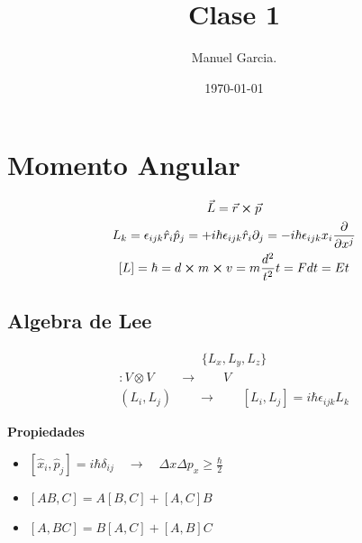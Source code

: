 \documentclass{article}
\title{Clase 1 }
\author{Manuel Garcia.}
\date{\today}
\begin{document}
\maketitle

\section{Momento Angular }
\begin{gather*}
  \vec L = \vec r \cross \vec p \\
  L_k  = \epsilon _{ijk } \hat r _i \hat p _j = + i \hbar \epsilon _{ijk }  \hat r _i \partial _j = - i \hbar \epsilon _{ijk } x_i \frac{\partial  }{\partial x ^ {j }}\\
  [L] = \hbar = d \cross m \cross v = m \frac{d ^2}{t ^2} t = F d t = E t 
\end{gather*}
 
\subsection{Algebra de Lee }
\begin{gather*}
  \{L_x,L_y,L_z\} 
\end{gather*}
\begin{gather*}
  [, ] : V \otimes V \qquad \rightarrow \qquad V \\
  (L_i , L_j ) \qquad \rightarrow \qquad  [L_i, L_j ] = i \hbar \epsilon _{ijk } L_k 
\end{gather*}

\textbf{Propiedades }
\begin{itemize}
  \item $ [\hat x_i, \hat p_j ] = i \hbar \delta _{ij } \quad \rightarrow \quad \Delta x \Delta p_x  \geq \frac{\hbar }{2} $
  \item $ [AB,C ] = A[B,C] + [A,C]B  $
  \item $ [A,BC] = B[A,C ] +  [A,B]C  $
\end{itemize}
\end{document}
